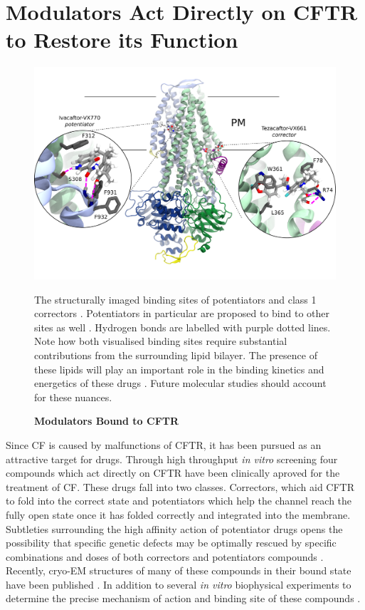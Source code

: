 \section{Modulators Act Directly on CFTR to Restore its Function}
\begin{figure}
	\label{drugs_bound}
	\begin{center}
		\includegraphics[width=1\textwidth]{figures/drugs_bound_overall.pdf}
	\end{center}
	\captionsetup{singlelinecheck = false, justification=raggedright}
	\caption[Modulators Bound to CFTR] {\textbf{Modulators Bound to CFTR}}{The structurally imaged binding sites of potentiators and class 1 correctors \cite{liu2019, fiedorczuk2022}. Potentiators in particular are proposed to bind to other sites as well \cite{yeh2019, liu2019}. Hydrogen bonds are labelled with purple dotted lines. Note how both visualised binding sites require substantial contributions from the surrounding lipid bilayer. The presence of these lipids will play an important role in the binding kinetics and energetics of these drugs \cite{csanady2019}. Future molecular studies should account for these nuances.} 
\end{figure}

Since CF is caused by malfunctions of CFTR, it has been pursued as an attractive target for drugs. Through high throughput \textit{in vitro} screening four compounds which act directly on CFTR have been clinically aproved for the treatment of CF. These drugs fall into two classes. Correctors, which aid CFTR to fold into the correct state and potentiators which help the channel reach the fully open state once it has folded correctly and integrated into the membrane. Subtleties surrounding the high affinity action of potentiator drugs opens the possibility that specific genetic defects may be optimally rescued by specific combinations and doses of both correctors and potentiators compounds \cite{csanady2019}. Recently, cryo-EM structures of many of these compounds in their bound state have been published \cite{liu2019, fiedorczuk2022}. In addition to several \textit {in vitro} biophysical experiments to determine the precise mechanism of action and binding site of these compounds \cite{csanady2019,  }.

